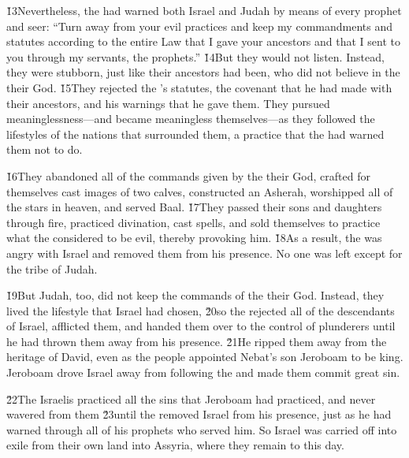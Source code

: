 \v{13}Nevertheless, the  had warned both Israel and Judah by means of every prophet and seer: ``Turn away from your evil practices and keep my commandments and statutes according to the entire Law that I gave your ancestors and that I sent to you through my servants, the prophets.'' \v{14}But they would not listen. Instead, they were stubborn, just like their ancestors had been, who did not believe in the  their God. \v{15}They rejected the 's statutes, the covenant that he had made with their ancestors, and his warnings that he gave them. They pursued meaninglessness---and became meaningless themselves---as they followed the lifestyles of the nations that surrounded them, a practice that the  had warned them not to do.

\v{16}They abandoned all of the commands given by the  their God, crafted for themselves cast images of two calves, constructed an Asherah, worshipped all of the stars in heaven, and served Baal. \v{17}They passed their sons and daughters through fire, practiced divination, cast spells, and sold themselves to practice what the  considered to be evil, thereby provoking him. \v{18}As a result, the  was angry with Israel and removed them from his presence. No one was left except for the tribe of Judah.

\v{19}But Judah, too, did not keep the commands of the  their God. Instead, they lived the lifestyle that Israel had chosen, \v{20}so the  rejected all of the descendants of Israel, afflicted them, and handed them over to the control of plunderers until he had thrown them away from his presence. \v{21}He ripped them away from the heritage of David, even as the people appointed Nebat's son Jeroboam to be king. Jeroboam drove Israel away from following the  and made them commit great sin.

\v{22}The Israelis practiced all the sins that Jeroboam had practiced, and never wavered from them \v{23}until the  removed Israel from his presence, just as he had warned through all of his prophets who served him. So Israel was carried off into exile from their own land into Assyria, where they remain to this day.

